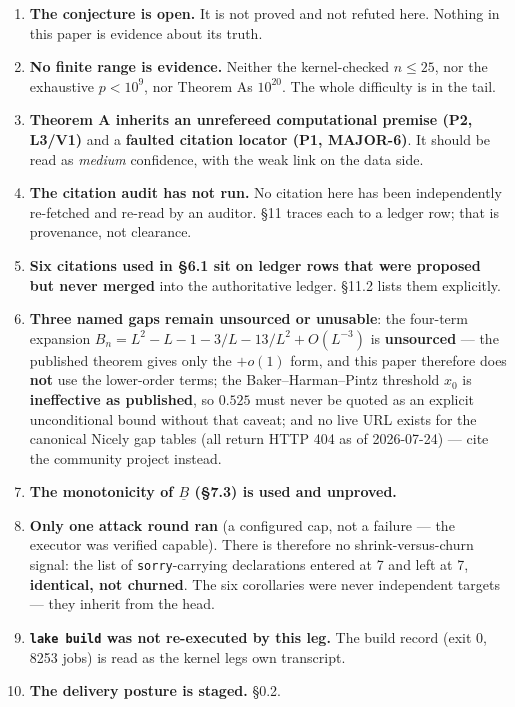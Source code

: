 \documentclass[
  a4paper,
  11pt]{article}
\providecommand{\tightlist}{%
  \setlength{\itemsep}{0pt}\setlength{\parskip}{0pt}}
\begin{document}
\begin{enumerate}
\def\labelenumi{\arabic{enumi}.}
\tightlist
\item
  \textbf{The conjecture is open.} It is not proved and not refuted
  here. Nothing in this paper is evidence about its truth.
\item
  \textbf{No finite range is evidence.} Neither the kernel-checked
  \(n \le 25\), nor the exhaustive \(p < 10^9\), nor Theorem
  A\textquotesingle s \(10^{20}\). The whole difficulty is in the tail.
\item
  \textbf{Theorem A inherits an unrefereed computational premise (P2,
  L3/V1)} and a \textbf{faulted citation locator (P1, MAJOR-6)}. It
  should be read as \emph{medium} confidence, with the weak link on the
  data side.
\item
  \textbf{The citation audit has not run.} No citation here has been
  independently re-fetched and re-read by an auditor. §11 traces each to
  a ledger row; that is provenance, not clearance.
\item
  \textbf{Six citations used in §6.1 sit on ledger rows that were
  proposed but never merged} into the authoritative ledger. §11.2 lists
  them explicitly.
\item
  \textbf{Three named gaps remain unsourced or unusable}: the four-term
  expansion \(B_n = L^2-L-1-3/L-13/L^2+O(L^{-3})\) is \textbf{unsourced}
  --- the published theorem gives only the \(+o(1)\) form, and this
  paper therefore does \textbf{not} use the lower-order terms; the
  Baker--Harman--Pintz threshold \(x_0\) is \textbf{ineffective as
  published}, so \(0.525\) must never be quoted as an explicit
  unconditional bound without that caveat; and no live URL exists for
  the canonical Nicely gap tables (all return HTTP 404 as of 2026-07-24)
  --- cite the community project instead.
\item
  \textbf{The monotonicity of \(\underline{B}\) (§7.3) is used and
  unproved.}
\item
  \textbf{Only one attack round ran} (a configured cap, not a failure
  --- the executor was verified capable). There is therefore no
  shrink-versus-churn signal: the list of \texttt{sorry}-carrying
  declarations entered at 7 and left at 7, \textbf{identical, not
  churned}. The six corollaries were never independent targets --- they
  inherit from the head.
\item
  \textbf{\texttt{lake\ build} was not re-executed by this leg.} The
  build record (exit 0, 8253 jobs) is read as the kernel
  leg\textquotesingle s own transcript.
\item
  \textbf{The delivery posture is staged.} §0.2.
\end{enumerate}
\end{document}
